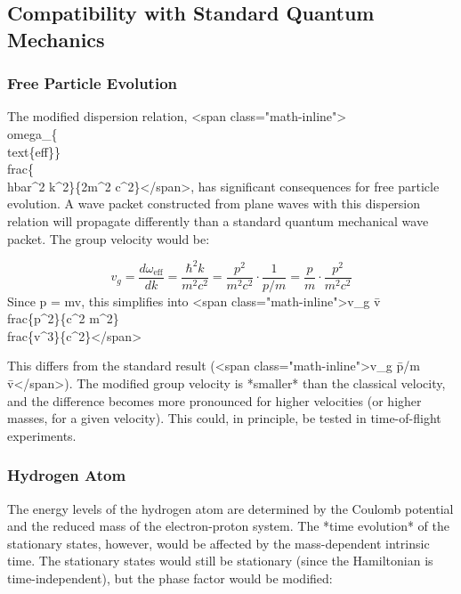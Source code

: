 \documentclass{article}
\begin{document}
{{{{				\subsection{Compatibility with Standard Quantum Mechanics}
				
				\subsubsection{Free Particle Evolution}
				
				The modified dispersion relation, <span class="math-inline">\\omega\_\{\\text\{eff\}\} \= \\frac\{\\hbar^2 k^2\}\{2m^2 c^2\}</span>, has significant consequences for free particle evolution.  A wave packet constructed from plane waves with this dispersion relation will propagate differently than a standard quantum mechanical wave packet. The group velocity would be:
				
				\begin{equation}
					v_g = \frac{d\omega_{\text{eff}}}{dk} = \frac{\hbar^2 k}{m^2 c^2} = \frac{p^2}{m^2c^2}\cdot \frac{1}{p/m}=\frac{p}{m} \cdot \frac{p^2}{m^2c^2}
				\end{equation}
				Since p = mv, this simplifies into <span class="math-inline">v\_g \= v\\frac\{p^2\}\{c^2 m^2\} \= \\frac\{v^3\}\{c^2\}</span>
				
				This differs from the standard result (<span class="math-inline">v\_g \= p/m \= v</span>).  The modified group velocity is *smaller* than the classical velocity, and the difference becomes more pronounced for higher velocities (or higher masses, for a given velocity).  This could, in principle, be tested in time-of-flight experiments.
				
				\subsubsection{Hydrogen Atom}
				
				The energy levels of the hydrogen atom are determined by the Coulomb potential and the reduced mass of the electron-proton system. The *time evolution* of the stationary states, however, would be affected by the mass-dependent intrinsic time.  The stationary states would still be stationary (since the Hamiltonian is time-independent), but the phase factor would be modified:
				
}}}}
\end{document}
